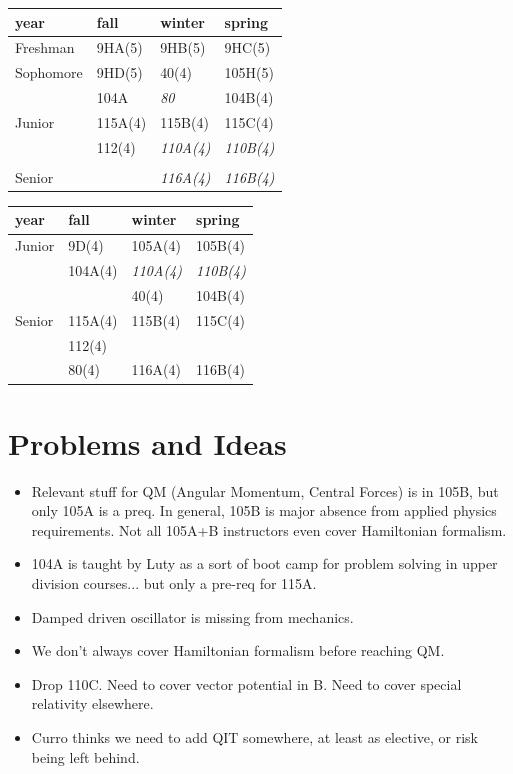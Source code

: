 \documentclass[12pt]{article}
\begin{document}
\begin{table}
\begin{center}
\begin{tabular}{|l|l|l|l|}
\hline
year      & fall    & winter & spring \\
\hline
Freshman  & 9HA(5)  & 9HB(5)  & 9HC(5) \\
\hline
Sophomore & 9HD(5)  & 40(4)    &  105H(5) \\
          & 104A    & {\it 80} &  104B(4) \\
\hline
Junior    & 115A(4) & 115B(4)  & 115C(4)\\
          & 112(4)  & {\it 110A(4)}  & {\it 110B(4)}\\
          &         &      &  \\
\hline
Senior    &     & {\it 116A(4)}     & {\it 116B(4)} \\
\hline 
\end{tabular}
\end{center}
\end{table}

\begin{table}
\begin{center}
\begin{tabular}{|l|l|l|l|}
\hline
year      & fall    & winter & spring \\
\hline
Junior   & 9D(4)     & 105A(4)     & 105B(4) \\
         & 104A(4)   & {\it 110A(4)}     & {\it 110B(4)} \\
         &           & 40(4)       & 104B(4) \\
\hline
Senior   & 115A(4)  & 115B(4)      & 115C(4) \\
         & 112(4)   &              &  \\
         & 80(4)    & 116A(4)      & 116B(4)  \\       
\hline 
\end{tabular}
\end{center}
\end{table}


\section{Problems and Ideas}
\begin{itemize}
\item Relevant stuff for QM (Angular Momentum, Central Forces) is in 105B, but only 105A is a preq.  In general, 105B is major absence from applied physics requirements.  Not all 105A+B instructors even cover Hamiltonian formalism.
\item 104A is taught by Luty as a sort of boot camp for problem solving in upper division courses... but only a pre-req for 115A.
\item Damped driven oscillator is missing from mechanics.
\item We don't always cover Hamiltonian formalism before reaching QM.
\item Drop 110C.  Need to cover vector potential in B.  Need to cover special relativity elsewhere.
\item Curro thinks we need to add QIT somewhere, at least as elective, or risk being left behind.
\end{itemize}
\end{document}
